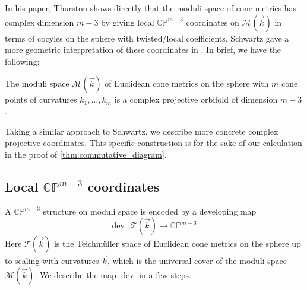 \documentclass{amsart}
\begin{document}
    In his paper, Thurston shows directly that the moduli space of cone metrics has complex dimension $m-3$ by giving local $\mathbb{CP}^{m-3}$ coordinates on $\mathcal{M}(\vec k)$ in terms of cocyles on the sphere with twisted/local coefficients. Schwartz gave a more geometric interpretation of these coordinates in \cite{Schwartz2015NotesPolyhedra}. In brief, we have the following:
    
    \begin{lemma} \label{lemma:moduli_coordinates}
        The moduli space $\mathcal{M}(\vec k)$ of Euclidean cone metrics on the sphere with $m$ cone points of curvatures $k_1,\dotsc, k_m$ is a complex projective orbifold of dimension $m-3$.
    \end{lemma}
    
    Taking a similar approach to Schwartz, we describe more concrete complex projective coordinates. This specific construction is for the sake of our calculation in the proof of \cref{thm:commutative_diagram}.
    
    \subsection{Local \texorpdfstring{$\mathbb{CP}^{m-3}$}{complex projective} coordinates}\label{subsec:coordinates}
    
    A $\mathbb{CP}^{m-3}$ structure on moduli space is encoded by a developing map $$\operatorname{dev}:\mathcal{T}(\vec k) \to \mathbb{CP}^{m-3}.$$ Here $\mathcal{T}(\vec k)$ is the Teichm\"uller space of Euclidean cone metrics on the sphere up to scaling with curvatures $\vec k$, which is the universal cover of the moduli space $\mathcal{M}(\vec k)$. We describe the map $\operatorname{dev}$ in a few steps.
    
\end{document}
